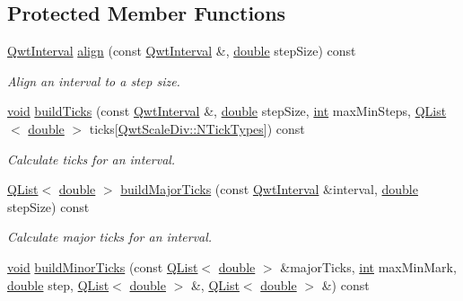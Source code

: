\subsection*{Protected Member Functions}
\begin{DoxyCompactItemize}
\item 
\hyperlink{class_qwt_interval}{Qwt\-Interval} \hyperlink{class_qwt_linear_scale_engine_a433918756a04fb25f29ed53f5d20bfd4}{align} (const \hyperlink{class_qwt_interval}{Qwt\-Interval} \&, \hyperlink{_super_l_u_support_8h_a8956b2b9f49bf918deed98379d159ca7}{double} step\-Size) const 
\begin{DoxyCompactList}\small\item\em Align an interval to a step size. \end{DoxyCompactList}\item 
\hyperlink{group___u_a_v_objects_plugin_ga444cf2ff3f0ecbe028adce838d373f5c}{void} \hyperlink{class_qwt_linear_scale_engine_a7d6a7687ea03a3ce9cde3478f7f21146}{build\-Ticks} (const \hyperlink{class_qwt_interval}{Qwt\-Interval} \&, \hyperlink{_super_l_u_support_8h_a8956b2b9f49bf918deed98379d159ca7}{double} step\-Size, \hyperlink{ioapi_8h_a787fa3cf048117ba7123753c1e74fcd6}{int} max\-Min\-Steps, \hyperlink{class_q_list}{Q\-List}$<$ \hyperlink{_super_l_u_support_8h_a8956b2b9f49bf918deed98379d159ca7}{double} $>$ ticks\mbox{[}\hyperlink{class_qwt_scale_div_af21aedaa886dd5e067cf63505838736ca86796bbf72d5eb7162a924ba27ce6553}{Qwt\-Scale\-Div\-::\-N\-Tick\-Types}\mbox{]}) const 
\begin{DoxyCompactList}\small\item\em Calculate ticks for an interval. \end{DoxyCompactList}\item 
\hyperlink{class_q_list}{Q\-List}$<$ \hyperlink{_super_l_u_support_8h_a8956b2b9f49bf918deed98379d159ca7}{double} $>$ \hyperlink{class_qwt_linear_scale_engine_a00844c641535d54074f235d1fe3430f5}{build\-Major\-Ticks} (const \hyperlink{class_qwt_interval}{Qwt\-Interval} \&interval, \hyperlink{_super_l_u_support_8h_a8956b2b9f49bf918deed98379d159ca7}{double} step\-Size) const 
\begin{DoxyCompactList}\small\item\em Calculate major ticks for an interval. \end{DoxyCompactList}\item 
\hyperlink{group___u_a_v_objects_plugin_ga444cf2ff3f0ecbe028adce838d373f5c}{void} \hyperlink{class_qwt_linear_scale_engine_a83a6be3d47d0fef14d39138a0130fe40}{build\-Minor\-Ticks} (const \hyperlink{class_q_list}{Q\-List}$<$ \hyperlink{_super_l_u_support_8h_a8956b2b9f49bf918deed98379d159ca7}{double} $>$ \&major\-Ticks, \hyperlink{ioapi_8h_a787fa3cf048117ba7123753c1e74fcd6}{int} max\-Min\-Mark, \hyperlink{_super_l_u_support_8h_a8956b2b9f49bf918deed98379d159ca7}{double} step, \hyperlink{class_q_list}{Q\-List}$<$ \hyperlink{_super_l_u_support_8h_a8956b2b9f49bf918deed98379d159ca7}{double} $>$ \&, \hyperlink{class_q_list}{Q\-List}$<$ \hyperlink{_super_l_u_support_8h_a8956b2b9f49bf918deed98379d159ca7}{double} $>$ \&) const 

\end{DoxyCompactItemize}
